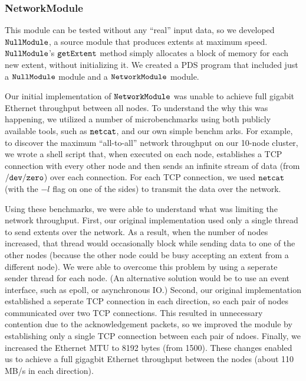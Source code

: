 \documentclass{acm_proc_article-sp}
\begin{document}
\subsubsection{NetworkModule}
  
This module can be tested without any ``real''  
  input data, so we developed $\tt NullModule$, a source module that produces
  extents at maximum speed. $\tt NullModule$'s $\tt getExtent$ method simply allocates  
  a block of memory for each new extent, without initializing it. We created a  
  PDS program that included just a $\tt NullModule$ module and a $\tt  
  NetworkModule$ module.
  
  Our initial implementation of $\tt NetworkModule$ was  
  unable to achieve full gigabit Ethernet throughput between all nodes. To
  understand the why this was happening, we utilized a number of microbenchmarks
  using both publicly available tools, such as $\tt netcat$, and our own simple benchm
 arks. For example, to discover the maximum ``all-to-all'' network throughput on our
 10-node cluster, we wrote a shell script that, when executed on each node, establishes
 a TCP connection with every other node and then sends an infinite stream
of data (from $\tt /dev/zero$) over each connection. For each TCP connection, we
used $\tt netcat$ (with the $-l$ flag on one of the sides) to transmit the data
over the network.
   
 Using these benchmarks, we were able to understand what was limiting the
 network throughput. First, our original implementation used only a single
 thread to send extents over the network. As a result, when the number of nodes increased, that thread would occasionally block while sending data to one of the other nodes (because the other node could be busy accepting an extent from a different node). We were able to overcome this problem by using a seperate sender thread for each node. (An alternative solution would be to use
  an event interface, such as epoll, or asynchronous IO.) Second, our original
  implementation established a seperate TCP connection in each direction, so
  each pair of nodes communicated over two TCP connections. This resulted in
  unnecessary contention due to the acknowledgement packets, so we improved the
  module by establishing only a single TCP connection between each pair of
  ndoes. Finally, we increased the Ethernet MTU to 8192 bytes (from 1500). These changes enabled us to achieve a full gigagbit Ethernet throughput between the nodes
  (about 110 MB/s in each direction).
\end{document}
